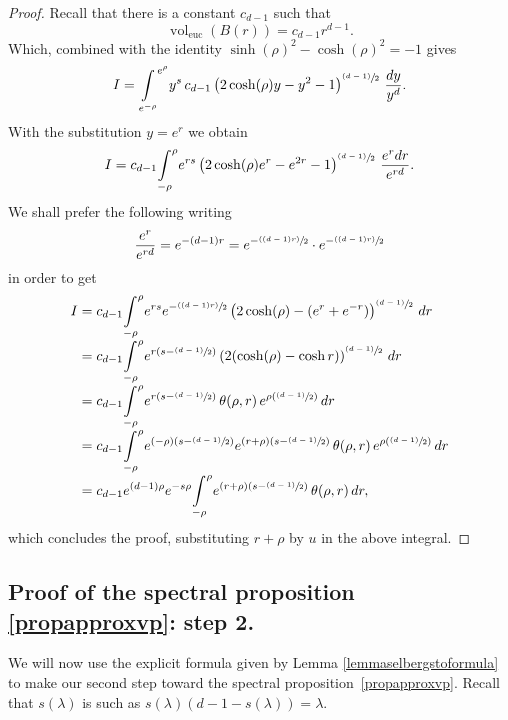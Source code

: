 \documentclass[JEP,XML,SOM,Unicode,NoFloatCountersInSection,published]{cedram}
\newcommand{\psfrac}[2]{\sfrac{(#1)}{#2}}
\theoremstyle{plain}
\theoremstyle{definition}
\newcommand{\inte}[1]{\underset{#1}{\int}}
\DeclareMathOperator{\vol}{vol}
\begin{document}
\begin{proof}
Recall that there is a constant $c_{d-1}$ such that\vspace*{-3pt}
\[
\vol_{\text{euc}} \left(B(r) \right) = c_{d-1} r^{d-1}.
\]
Which, combined with the identity $\sinh(\rho)^2 - \cosh(\rho)^2 = -1$ gives\vspace*{-3pt}
\[
I = \inte{e^{-\rho}}^{e^{\rho}} y^s \, c_{d-1} \left(2 \cosh(\rho)y - y^2 - 1 \right)^{\psfrac{d-1}{2}} \, \frac{dy}{y^d}.
\]
With the substitution $y = e^r$ we obtain\vspace*{-3pt}
\[
I = c_{d-1} \inte{-\rho}^{\rho} e^{rs} \left(2 \cosh(\rho)e^r - e^{2r} - 1 \right)^{\psfrac{d-1}{2}} \, \frac{e^{r}dr}{e^{rd}}.
\]
We shall prefer the following writing\vspace*{-3pt}
\[
\frac{e^{r}}{e^{rd}} = e^{-(d-1)r} = e^{-\psfrac{(d-1)r}{2}} \cdot e^{-\psfrac{(d-1)r}{2}}
\]
in order to get\vspace*{-3pt}
\begin{align*}
I & = c_{d-1} \inte{-\rho}^{\rho} e^{rs} e^{-\psfrac{(d-1)r}{2}} \left(2 \cosh(\rho) - (e^{r} + e^{-r}) \right)^{\psfrac{d-1}{2}} \,dr \\[-3pt]
& = c_{d-1} \inte{-\rho}^{\rho} e^{r \left(s- \psfrac{d-1}{2} \right)} \left(2 (\cosh(\rho) - \cosh{r}) \right)^{\psfrac{d-1}{2}} \,dr \\[-3pt]
& = c_{d-1} \inte{-\rho}^{\rho} e^{r \left(s- \psfrac{d-1}{2} \right)} \,\theta(\rho,r) \, e^{\rho \left(\psfrac{d-1}{2} \right)} \,dr \\[-3pt]
& = c_{d-1} \inte{-\rho}^{\rho} e^{(-\rho) \left(s- \psfrac{d-1}{2} \right)} e^{(r + \rho) \left(s- \psfrac{d-1}{2} \right)} \,\theta(\rho,r) \, e^{\rho \left(\psfrac{d-1}{2} \right) } \,dr \\[-3pt]
& = c_{d-1} e^{(d-1)\rho} e^{ -s \rho} \inte{-\rho}^{\rho} e^{(r + \rho) \left(s- \psfrac{d-1}{2} \right)} \,\theta(\rho,r) \,dr,
\end{align*}
which concludes the proof, substituting $r + \rho$ by $ u$ in the above integral.
\end{proof}

\subsection{Proof of the spectral proposition \ref{propapproxvp}: step 2.}
We will now use the explicit formula given by Lemma \ref{lemmaselbergstoformula} to make our second step toward the spectral proposition~\ref{propapproxvp}. Recall that $s(\lambda)$ is such as $s(\lambda)(d-1-s(\lambda)) = \lambda$.
\end{document}
